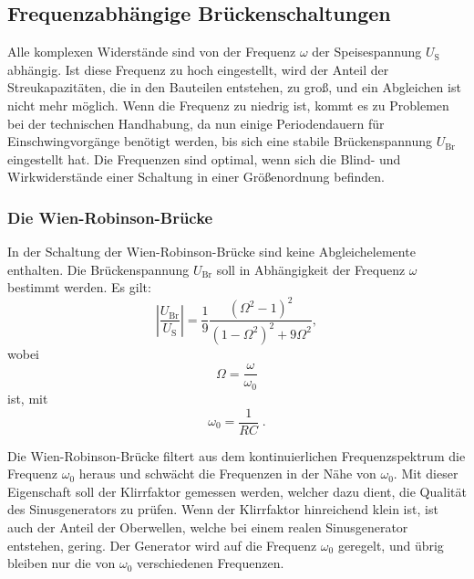 \subsection{Frequenzabhängige Brückenschaltungen}

    Alle komplexen Widerstände sind von der Frequenz $\omega$ der Speisespannung $U_\text{S}$ abhängig.
    Ist diese Frequenz zu hoch eingestellt, wird der Anteil der Streukapazitäten, die in den Bauteilen
    entstehen, zu groß, und ein Abgleichen ist nicht mehr möglich.
    Wenn die Frequenz zu niedrig ist, kommt es zu Problemen bei der technischen Handhabung,
    da nun einige Periodendauern für Einschwingvorgänge benötigt werden, bis sich eine stabile Brückenspannung $U_\text{Br}$
    eingestellt hat.
    Die Frequenzen sind optimal, wenn sich die Blind- und Wirkwiderstände einer Schaltung
    in einer Größenordnung befinden.

    \subsubsection{Die Wien-Robinson-Brücke} \label{sec:WR}

        In der Schaltung der Wien-Robinson-Brücke sind keine Abgleichelemente enthalten.
        Die Brückenspannung $U_\text{Br}$ soll in Abhängigkeit der Frequenz $\omega$ bestimmt werden.
        Es gilt:
        \begin{equation}
            \left\lvert \frac{U_\text{Br}}{U_\text{S}} \right\rvert = \frac{1}{9} \frac{(\Omega^2 - 1)^2}{(1 - \Omega^2)^2 + 9\Omega^2},
        \end{equation}
        wobei
        \begin{equation}
            \Omega = \frac{\omega}{\omega_0} \label{eqn: GroßOmega}
        \end{equation}
        ist, mit
        \begin{equation}
            \omega_0 = \frac{1}{RC} \; . \label{eqn: omeganull}
        \end{equation}

        Die Wien-Robinson-Brücke filtert aus dem kontinuierlichen Frequenzspektrum die Frequenz $\omega_0$ heraus
        und schwächt die Frequenzen in der Nähe von $\omega_0$.
        Mit dieser Eigenschaft soll der Klirrfaktor gemessen werden, welcher dazu dient, die Qualität des
        Sinusgenerators zu prüfen.
        Wenn der Klirrfaktor hinreichend klein ist, ist auch der Anteil der Oberwellen, welche bei einem
        realen Sinusgenerator entstehen, gering.
        Der Generator wird auf die Frequenz $\omega_0$ geregelt, und übrig bleiben nur die von $\omega_0$
        verschiedenen Frequenzen.

